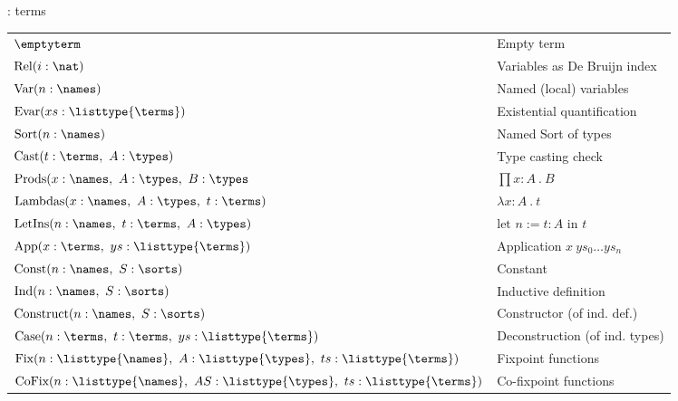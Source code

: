 \begin{frame}{\pcic: terms}
	\vspace{-0.7em}
	\begin{tabular}{ll}
		$\emptyterm$                                        & Empty term \\
		$\text{Rel}(i:\nat)$                       & Variables as De Bruijn index \\
		$\text{Var}(n:\names)$                     & Named (local) variables \\
		$\text{Evar}(xs:\listtype{\terms}) $        & Existential quantification \\
		$\text{Sort}(n:\names)$                    & Named Sort of types \\
		$\text{Cast}(t:\terms,~ A:\types)$ & Type casting check \\
		$\text{Prods}(x:\names,~ A:\types,~ B:\types$ & $\prod x:A ~.~ B$ \\
		$\text{Lambdas}(x:\names,~ A:\types,~ t:\terms)$   & $\lambda x:A ~.~ t$ \\
		$\text{LetIns}(n:\names,~ t:\terms,~ A:\types)$    & $\text{let~} n := t : A \text{~in~} t$ \\
		$\text{App}(x:\terms,~ ys:\listtype{\terms})$ & Application $x~ys_0 \ldots ys_n$ \\
		$\text{Const}(n:\names,~ S:\sorts)$ & Constant \\
		$\text{Ind}(n:\names,~ S:\sorts)$  & Inductive definition \\
		$\text{Construct}(n:\names,~ S:\sorts)$ & Constructor (of ind. def.) \\
		$\text{Case}(n:\terms,~ t:\terms,~ ys:\listtype{\terms})$ & Deconstruction (of ind. types) \\
		$\text{Fix}(n:\listtype{\names},~ A:\listtype{\types},~ ts:\listtype{\terms})$ & Fixpoint functions \\
		$\text{CoFix}(n:\listtype{\names},~ AS:\listtype{\types},~ ts:\listtype{\terms})$ & Co-fixpoint functions \\
	\end{tabular}
\end{frame}

